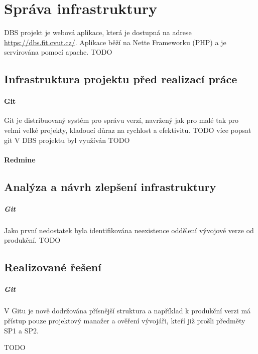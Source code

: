 \chapter{Správa infrastruktury} \label{infrastructure}

DBS projekt je webová aplikace, která je dostupná na adrese \url{https://dbs.fit.cvut.cz/}. Aplikace běží na Nette Frameworku (PHP) a je servírována pomocí apache.
TODO


\section{Infrastruktura projektu před realizací práce}

\subsubsection{Git}

Git \cite{git} je distribuovaný systém pro správu verzí, navržený jak pro malé tak pro velmi velké projekty, kladoucí důraz na rychlost a efektivitu.
TODO více popsat git
V DBS projektu byl využíván TODO

\subsubsection{Redmine} \label{infrastructure:redmine}


\section{Analýza a návrh zlepšení infrastruktury}

\paragraph{Git} Jako první nedostatek byla identifikována neexistence oddělení vývojové verze od produkční.
TODO


\section{Realizované řešení}

\paragraph{Git} V Gitu je nově dodržována přísnější struktura a například k produkční verzi má přístup pouze projektový manažer a ověření vývojáři, kteří již prošli předměty SP1 a SP2.

TODO